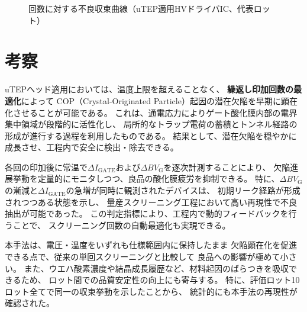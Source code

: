 \documentclass[twocolumn]{ieeetran}
\begin{document}
\begin{figure}[t]
  \centering
  \caption{回数に対する不良収束曲線（uTEP適用HVドライバIC、代表ロット）}
  \label{fig_convergence}
\end{figure}

\section{考察}

uTEPヘッド適用においては、温度上限を超えることなく、
\textbf{繰返し印加回数の最適化}によって
COP（Crystal-Originated Particle）起因の潜在欠陥を早期に顕在化させることが可能である。
これは、通電応力によりゲート酸化膜内部の電界集中領域が段階的に活性化し、
局所的なトラップ電荷の蓄積とトンネル経路の形成が進行する過程を利用したものである。
結果として、潜在欠陥を穏やかに成長させ、工程内で安全に検出・除去できる。

各回の印加後に常温で$\Delta I_\mathrm{GATE}$および$\Delta BV_\mathrm{G}$を逐次計測することにより、
欠陥進展挙動を定量的にモニタしつつ、良品の酸化膜疲労を抑制できる。
特に、$\Delta BV_\mathrm{G}$の漸減と$\Delta I_\mathrm{GATE}$の急増が同時に観測されたデバイスは、
初期リーク経路が形成されつつある状態を示し、
量産スクリーニング工程において高い再現性で不良抽出が可能であった。
この判定指標により、工程内で動的フィードバックを行うことで、
スクリーニング回数の自動最適化も実現できる。

本手法は、電圧・温度をいずれも仕様範囲内に保持したまま
欠陥顕在化を促進できる点で、従来の単回スクリーニングと比較して
良品への影響が極めて小さい。
また、ウエハ酸素濃度や結晶成長履歴など、材料起因のばらつきを吸収できるため、
ロット間での品質安定性の向上にも寄与する。
特に、評価ロット10ロット全てで同一の収束挙動を示したことから、
統計的にも本手法の再現性が確認された。
\end{document}
